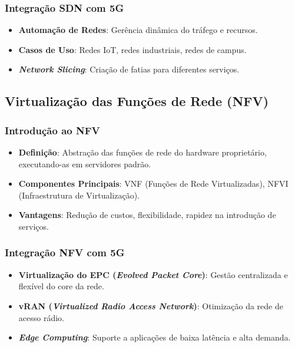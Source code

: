 \begin{frame}
    \frametitle{Integração SDN com 5G}
    \begin{itemize}
        \item \textbf{Automação de Redes}: Gerência dinâmica do tráfego e recursos.
        \item \textbf{Casos de Uso}: Redes IoT, redes industriais, redes de campus.
        \item \textbf{\textit{Network Slicing}}: Criação de fatias para diferentes serviços.
    \end{itemize}
\end{frame}

\subsection{Virtualização das Funções de Rede (NFV)}
\begin{frame}
    \frametitle{Introdução ao NFV}
    \begin{itemize}
        \item \textbf{Definição}: Abstração das funções de rede do hardware proprietário, executando-as em servidores padrão.
        \item \textbf{Componentes Principais}: VNF (Funções de Rede Virtualizadas), NFVI (Infraestrutura de Virtualização).
        \item \textbf{Vantagens}: Redução de custos, flexibilidade, rapidez na introdução de serviços.
    \end{itemize}
\end{frame}

\begin{frame}
    \frametitle{Integração NFV com 5G}
    \begin{itemize}
        \item \textbf{Virtualização do EPC (\textit{Evolved Packet Core})}: Gestão centralizada e flexível do core da rede.
        \item \textbf{vRAN (\textit{Virtualized Radio Access Network})}: Otimização da rede de acesso rádio.
        \item \textbf{\textit{Edge Computing}}: Suporte a aplicações de baixa latência e alta demanda.
    \end{itemize}
\end{frame}

